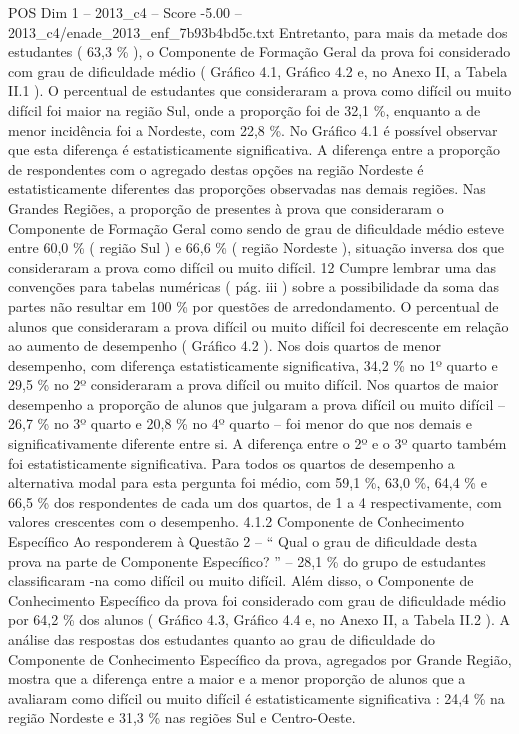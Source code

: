 \begin{textsample}{POS Dim 1 – 2013\_c4 – Score -5.00 – 2013\_c4/enade\_2013\_enf\_7b93b4bd5c.txt}
Entretanto, para mais da metade dos estudantes ( 63,3 \% ), o Componente de Formação Geral da prova foi considerado com grau de dificuldade médio ( Gráfico 4.1, Gráfico 4.2 e, no Anexo II, a Tabela II.1 ).
O percentual de estudantes que consideraram a prova como difícil ou muito difícil foi maior na região Sul, onde a proporção foi de 32,1 \%, enquanto a de menor incidência foi a Nordeste, com 22,8 \%.
No Gráfico 4.1 é possível observar que esta diferença é estatisticamente significativa.
A diferença entre a proporção de respondentes com o agregado destas opções na região Nordeste é estatisticamente diferentes das proporções observadas nas demais regiões.
Nas Grandes Regiões, a proporção de presentes à prova que consideraram o Componente de Formação Geral como sendo de grau de dificuldade médio esteve entre 60,0 \% ( região Sul ) e 66,6 \% ( região Nordeste ), situação inversa dos que consideraram a prova como difícil ou muito difícil. 12 Cumpre lembrar uma das convenções para tabelas numéricas ( pág. iii ) sobre a possibilidade da soma das partes não resultar em 100 \% por questões de arredondamento.
O percentual de alunos que consideraram a prova difícil ou muito difícil foi decrescente em relação ao aumento de desempenho ( Gráfico 4.2 ).
Nos dois quartos de menor desempenho, com diferença estatisticamente significativa, 34,2 \% no 1º quarto e 29,5 \% no 2º consideraram a prova difícil ou muito difícil.
Nos quartos de maior desempenho a proporção de alunos que julgaram a prova difícil ou muito difícil – 26,7 \% no 3º quarto e 20,8 \% no 4º quarto – foi menor do que nos demais e significativamente diferente entre si.
A diferença entre o 2º e o 3º quarto também foi estatisticamente significativa.
Para todos os quartos de desempenho a alternativa modal para esta pergunta foi médio, com 59,1 \%, 63,0 \%, 64,4 \% e 66,5 \% dos respondentes de cada um dos quartos, de 1 a 4 respectivamente, com valores crescentes com o desempenho. 4.1.2 Componente de Conhecimento Específico Ao responderem à Questão 2 – “ Qual o grau de dificuldade desta prova na parte de Componente Específico? ” – 28,1 \% do grupo de estudantes classificaram -na como difícil ou muito difícil.
Além disso, o Componente de Conhecimento Específico da prova foi considerado com grau de dificuldade médio por 64,2 \% dos alunos ( Gráfico 4.3, Gráfico 4.4 e, no Anexo II, a Tabela II.2 ).
A análise das respostas dos estudantes quanto ao grau de dificuldade do Componente de Conhecimento Específico da prova, agregados por Grande Região, mostra que a diferença entre a maior e a menor proporção de alunos que a avaliaram como difícil ou muito difícil é estatisticamente significativa : 24,4 \% na região Nordeste e 31,3 \% nas regiões Sul e Centro-Oeste.

\end{textsample}
